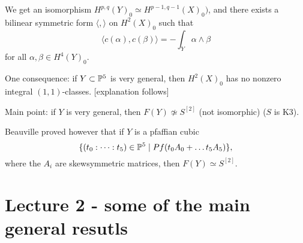 \documentclass[11pt, english]{article}
\begin{document}
We get an isomorphism $H^{p,q}(Y)_0 \simeq H^{p-1,q-1}(X)_0)$, and there exists a bilinear symmetric form $\langle, \rangle$ on $H^2(X)_0$ such that
$$
\langle c(\alpha), c(\beta) \rangle = - \int_Y \alpha \wedge \beta
$$
for all $\alpha, \beta \in H^4(Y)_0$. 

One consequence: if $Y \subset \mathbb{P}^5$ is very general, then $H^2(X)_0$ has no nonzero integral $(1,1)$-classes. [explanation follows]

Main point: if $Y$ is very general, then $F(Y) \not \simeq S^{[2]}$ (not isomorphic) ($S$ is K3).

Beauville proved however that if $Y$ is a pfaffian cubic
$$
\{ (t_0: \cdots : t_5) \in \mathbb{P}^5 \mid Pf(t_0A_0+\ldots t_5A_5)\},
$$
where the $A_i$ are skewsymmetric matrices, then $F(Y) \simeq S^{[2]}$. 



\section{Lecture 2 - some of the main general resutls}
\end{document}

